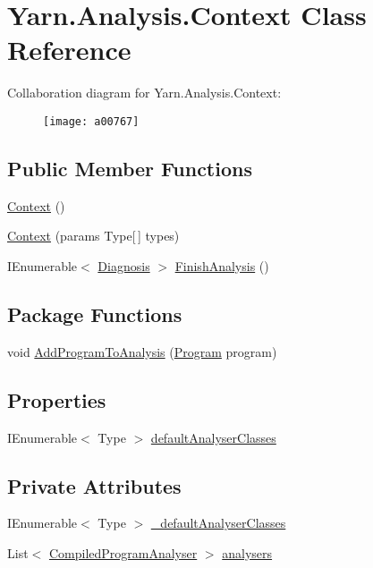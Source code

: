 \hypertarget{a00057}{\section{Yarn.\-Analysis.\-Context Class Reference}
\label{a00057}
}


Collaboration diagram for Yarn.\-Analysis.\-Context\-:
\nopagebreak
\begin{figure}[H]
\begin{center}
\leavevmode
\texttt{[image: a00767]}
\end{center}
\end{figure}
\subsection*{Public Member Functions}
\begin{DoxyCompactItemize}
\item 
\hyperlink{a00057_a8e2c56843e8d374b0f90e23326d8d14a}{Context} ()
\item 
\hyperlink{a00057_ad5f41fb64637c4938bce811153492731}{Context} (params Type\mbox{[}$\,$\mbox{]} types)
\item 
I\-Enumerable$<$ \hyperlink{a00091}{Diagnosis} $>$ \hyperlink{a00057_a1eadea062a5899a64d00ea0172cbbb43}{Finish\-Analysis} ()
\end{DoxyCompactItemize}
\subsection*{Package Functions}
\begin{DoxyCompactItemize}
\item 
void \hyperlink{a00057_a60255a6d54f296d199507acef251244c}{Add\-Program\-To\-Analysis} (\hyperlink{a00152}{Program} program)
\end{DoxyCompactItemize}
\subsection*{Properties}
\begin{DoxyCompactItemize}
\item 
I\-Enumerable$<$ Type $>$ \hyperlink{a00057_afdf24f2512251c2203ba1bde8f4a0f90}{default\-Analyser\-Classes}
\end{DoxyCompactItemize}
\subsection*{Private Attributes}
\begin{DoxyCompactItemize}
\item 
I\-Enumerable$<$ Type $>$ \hyperlink{a00057_ad06829cf848a5936db5724ebced758ec}{\-\_\-default\-Analyser\-Classes}
\item 
List$<$ \hyperlink{a00053}{Compiled\-Program\-Analyser} $>$ \hyperlink{a00057_aa5c7eaa90ad9c47969a3b336080d8991}{analysers}
\end{DoxyCompactItemize}



